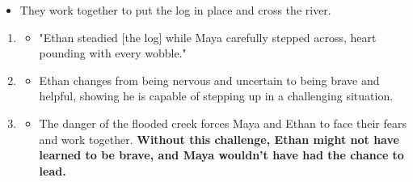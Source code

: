 \documentclass[12pt]{article}
\begin{document}
\begin{tcolorbox}[colframe=black!60, colback=white, 
coltitle=black, colbacktitle=black!15, fonttitle=\bfseries\Large, 
title=Examples, halign title=center, left=10pt, right=10pt, top=10pt, bottom=15pt]
\begin{itemize}
       \item They work together to put the log in place and cross the river.
   \end{itemize}
       \begin{enumerate}
       \item
           \begin{itemize}
               \item "Ethan steadied [the log] while Maya carefully stepped across, heart pounding with every wobble."
           \end{itemize}
           \item
           \begin{itemize}
               \item Ethan changes from being nervous and uncertain to being brave and helpful, showing he is capable of stepping up in a challenging situation.
           \end{itemize}
           \item
           \begin{itemize}
               \item The danger of the flooded creek forces Maya and Ethan to face their fears and work together. \textbf{Without this challenge, Ethan might not have learned to be brave, and Maya wouldn’t have had the chance to lead.}
           \end{itemize}



   \end{enumerate}
           









   



 





     \end{tcolorbox}
\vspace{1em}
\end{document}
